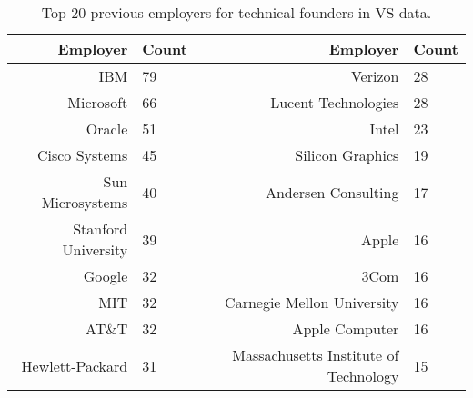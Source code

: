 \begin{table}[]
\centering
\begingroup\normalsize
\begin{tabular}{rlrl}
  \toprule
Employer & Count & Employer & Count \\ 
  \midrule
IBM & 79 & Verizon & 28 \\ 
  Microsoft & 66 & Lucent Technologies & 28 \\ 
  Oracle & 51 & Intel & 23 \\ 
  Cisco Systems & 45 & Silicon Graphics & 19 \\ 
  Sun Microsystems & 40 & Andersen Consulting & 17 \\ 
  Stanford University & 39 & Apple & 16 \\ 
  Google & 32 & 3Com & 16 \\ 
  MIT & 32 & Carnegie Mellon University & 16 \\ 
  AT\&T & 32 & Apple Computer & 16 \\ 
  Hewlett-Packard & 31 & Massachusetts Institute of Technology & 15 \\ 
   \bottomrule
\end{tabular}
\endgroup
\caption{Top 20 previous employers for technical founders in VS data.} 
\label{table:VS_previousEmployersNoPositionsSummaryTable}
\end{table}
